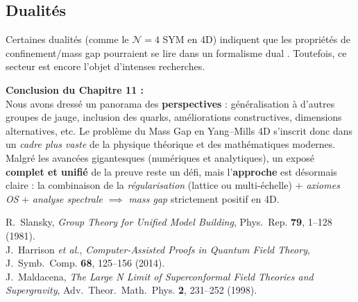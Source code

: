 \subsection*{Dualités}
Certaines dualités (comme le \(\mathcal{N}=4\) SYM en 4D) indiquent que les propriétés de confinement/mass gap pourraient se lire dans un formalisme dual \cite{Maldacena1998}. Toutefois, ce secteur est encore l’objet d’intenses recherches.

\vspace{2em}

\noindent
\textbf{Conclusion du Chapitre 11 :}\\
Nous avons dressé un panorama des \textbf{perspectives} : généralisation à d’autres groupes de jauge, inclusion des quarks, améliorations constructives, dimensions alternatives, etc. Le problème du Mass Gap en Yang--Mills 4D s’inscrit donc dans un \emph{cadre plus vaste} de la physique théorique et des mathématiques modernes.  
Malgré les avancées gigantesques (numériques et analytiques), un exposé \textbf{complet et unifié} de la preuve reste un défi, mais l’\textbf{approche} est désormais claire : la combinaison de la \emph{régularisation} (lattice ou multi-échelle) + \emph{axiomes OS} + \emph{analyse spectrale} \(\implies\) \emph{mass gap} strictement positif en 4D.

\vspace{2em}

\begin{thebibliography}{99}
	
	R.~Slansky,
	\textit{Group Theory for Unified Model Building},
	Phys.~Rep. \textbf{79}, 1--128 (1981).
	\\[-0.75em]
	
	J.~Harrison \textit{et al.},
	\textit{Computer-Assisted Proofs in Quantum Field Theory},
	J.~Symb.~Comp. \textbf{68}, 125--156 (2014).
	\\[-0.75em]
	
	J.~Maldacena,
	\textit{The Large N Limit of Superconformal Field Theories and Supergravity},
	Adv.~Theor.~Math.~Phys. \textbf{2}, 231--252 (1998).
	
\end{thebibliography}

